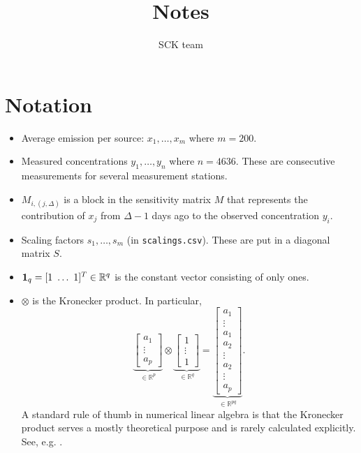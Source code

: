 \documentclass{article}
\title{Notes}
\author{SCK team}
\date{}
\begin{document}
    \maketitle

\section{Notation}
\begin{itemize}
    \item Average emission per source: $x_1,\dots,x_m$ where $m = 200$.
    \item Measured concentrations $y_1,\dots,y_n$ where $n = 4636$. These are consecutive measurements for several measurement stations. 
    \item $M_{i,(j,\Delta)}$ is a block in the sensitivity matrix $M$ that represents the contribution of $x_j$ from $\Delta - 1$ days ago to the observed concentration $y_i$.
    \item Scaling factors $s_1,\dots,s_m$ (in \texttt{scalings.csv}). These are put in a diagonal matrix $S$.
    \item $\vb{1}_q = [1\,\, \dots\,\, 1]^T \in \mathbb{R}^q$ is the constant vector consisting of only ones.
    \item $\otimes$ is the Kronecker product. In particular,
        $$
        \underbrace{
        \begin{bmatrix}
            a_1 \\
            \vdots \\
            a_p
        \end{bmatrix}
        }_{\in \mathbb{R}^{p}}
        \otimes 
        \underbrace{
        \begin{bmatrix}
            1 \\
            \vdots \\
            1
        \end{bmatrix}
        }_{\in \mathbb{R}^{q}}
        =
        \underbrace{
        \begin{bmatrix}
            a_1 \\
            \vdots \\
            a_1 \\
            a_2 \\
            \vdots \\
            a_2 \\
            \vdots \\
            a_p
        \end{bmatrix}
        }_{\in \mathbb{R}^{pq}}
        .$$
        A standard rule of thumb in numerical linear algebra is that the Kronecker product serves a mostly theoretical purpose and is rarely calculated explicitly. See, e.g. \cite[Section 12.3]{Golub2013}.
\end{itemize}
\end{document}

